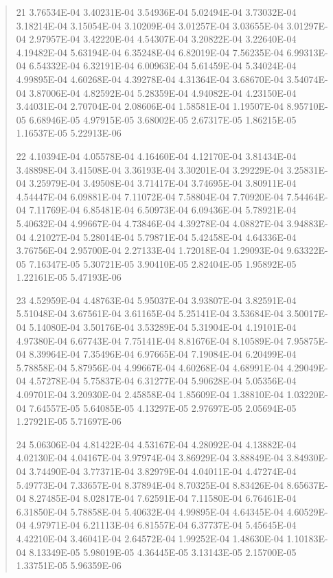 \documentclass[letterpaper,10pt,english]{sphinxmanual}
\begin{document}
\begin{quote}
\begin{DUlineblock}{0em}
\item[] 21   3.76534E-04  3.40231E-04  3.54936E-04  5.02494E-04  3.73032E-04  3.18214E-04  3.15054E-04  3.10209E-04  3.01257E-04  3.03655E-04  3.01297E-04  2.97957E-04  3.42220E-04  4.54307E-04  3.20822E-04  3.22640E-04  4.19482E-04  5.63194E-04  6.35248E-04  6.82019E-04  7.56235E-04  6.99313E-04  6.54332E-04  6.32191E-04  6.00963E-04  5.61459E-04  5.34024E-04  4.99895E-04  4.60268E-04  4.39278E-04  4.31364E-04  3.68670E-04  3.54074E-04  3.87006E-04  4.82592E-04  5.28359E-04  4.94082E-04  4.23150E-04  3.44031E-04  2.70704E-04  2.08606E-04  1.58581E-04  1.19507E-04  8.95710E-05  6.68946E-05  4.97915E-05  3.68002E-05  2.67317E-05  1.86215E-05  1.16537E-05  5.22913E-06
\item[] 22   4.10394E-04  4.05578E-04  4.16460E-04  4.12170E-04  3.81434E-04  3.48898E-04  3.41508E-04  3.36193E-04  3.30201E-04  3.29229E-04  3.25831E-04  3.25979E-04  3.49508E-04  3.71417E-04  3.74695E-04  3.80911E-04  4.54447E-04  6.09881E-04  7.11072E-04  7.58804E-04  7.70920E-04  7.54464E-04  7.11769E-04  6.85481E-04  6.50973E-04  6.09436E-04  5.78921E-04  5.40632E-04  4.99667E-04  4.73846E-04  4.39278E-04  4.08827E-04  3.94883E-04  4.21027E-04  5.28014E-04  5.79871E-04  5.42458E-04  4.64336E-04  3.76756E-04  2.95700E-04  2.27133E-04  1.72018E-04  1.29093E-04  9.63322E-05  7.16347E-05  5.30721E-05  3.90410E-05  2.82404E-05  1.95892E-05  1.22161E-05  5.47193E-06
\item[] 23   4.52959E-04  4.48763E-04  5.95037E-04  3.93807E-04  3.82591E-04  5.51048E-04  3.67561E-04  3.61165E-04  5.25141E-04  3.53684E-04  3.50017E-04  5.14080E-04  3.50176E-04  3.53289E-04  5.31904E-04  4.19101E-04  4.97380E-04  6.67743E-04  7.75141E-04  8.81676E-04  8.10589E-04  7.95875E-04  8.39964E-04  7.35496E-04  6.97665E-04  7.19084E-04  6.20499E-04  5.78858E-04  5.87956E-04  4.99667E-04  4.60268E-04  4.68991E-04  4.29049E-04  4.57278E-04  5.75837E-04  6.31277E-04  5.90628E-04  5.05356E-04  4.09701E-04  3.20930E-04  2.45858E-04  1.85609E-04  1.38810E-04  1.03220E-04  7.64557E-05  5.64085E-05  4.13297E-05  2.97697E-05  2.05694E-05  1.27921E-05  5.71697E-06
\item[] 24   5.06306E-04  4.81422E-04  4.53167E-04  4.28092E-04  4.13882E-04  4.02130E-04  4.04167E-04  3.97974E-04  3.86929E-04  3.88849E-04  3.84930E-04  3.74490E-04  3.77371E-04  3.82979E-04  4.04011E-04  4.47274E-04  5.49773E-04  7.33657E-04  8.37894E-04  8.70325E-04  8.83426E-04  8.65637E-04  8.27485E-04  8.02817E-04  7.62591E-04  7.11580E-04  6.76461E-04  6.31850E-04  5.78858E-04  5.40632E-04  4.99895E-04  4.64345E-04  4.60529E-04  4.97971E-04  6.21113E-04  6.81557E-04  6.37737E-04  5.45645E-04  4.42210E-04  3.46041E-04  2.64572E-04  1.99252E-04  1.48630E-04  1.10183E-04  8.13349E-05  5.98019E-05  4.36445E-05  3.13143E-05  2.15700E-05  1.33751E-05  5.96359E-06

\end{DUlineblock}
\end{quote}
\end{document}

